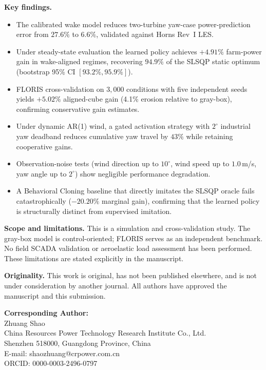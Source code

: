 \documentclass[11pt]{article}
\begin{document}
\noindent
\textbf{Key findings.}
\begin{itemize}
\item The calibrated wake model reduces two-turbine yaw-case power-prediction error from $27.6\%$ to $6.6\%$, validated against Horns Rev~I LES.
\item Under steady-state evaluation the learned policy achieves $+4.91\%$ farm-power gain in wake-aligned regimes, recovering $94.9\%$ of the SLSQP static optimum (bootstrap 95\% CI $[93.2\%, 95.9\%]$).
\item FLORIS cross-validation on $3{,}000$ conditions with five independent seeds yields $+5.02\%$ aligned-cube gain (4.1\% erosion relative to gray-box), confirming conservative gain estimates.
\item Under dynamic AR(1) wind, a gated activation strategy with $2^\circ$ industrial yaw deadband reduces cumulative yaw travel by $43\%$ while retaining cooperative gains.
\item Observation-noise tests (wind direction up to $10^\circ$, wind speed up to $1.0$\,m/s, yaw angle up to $2^\circ$) show negligible performance degradation.
\item A Behavioral Cloning baseline that directly imitates the SLSQP oracle fails catastrophically ($-20.20\%$ marginal gain), confirming that the learned policy is structurally distinct from supervised imitation.
\end{itemize}

\vspace{0.3cm}

\noindent
\textbf{Scope and limitations.}
This is a simulation and cross-validation study. The gray-box model is control-oriented; FLORIS serves as an independent benchmark. No field SCADA validation or aeroelastic load assessment has been performed. These limitations are stated explicitly in the manuscript.

\vspace{0.3cm}

\noindent
\textbf{Originality.}
This work is original, has not been published elsewhere, and is not under consideration by another journal. All authors have approved the manuscript and this submission.

\vspace{0.5cm}

\noindent
\textbf{Corresponding Author:}\\
Zhuang Shao\\
China Resources Power Technology Research Institute Co., Ltd.\\
Shenzhen 518000, Guangdong Province, China\\
E-mail: shaozhuang@crpower.com.cn\\
ORCID: 0000-0003-2496-0797
\end{document}
